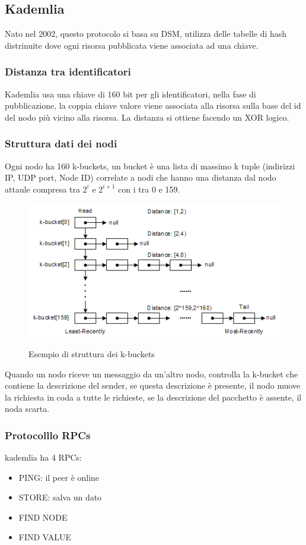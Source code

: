 \subsection{Kademlia}
Nato nel 2002, questo protocolo si basa su DSM, utilizza delle tabelle di hash distrinuite dove ogni risorsa pubblicata viene associata ad una chiave.

\subsubsection{Distanza tra identificatori}
Kademlia usa una chiave di 160 bit per gli identificatori, nella fase di pubblicazione, la coppia chiave valore viene associata alla risorsa sulla base del id del nodo più vicino alla risorsa.
La distanza si ottiene facendo un XOR logico.
\subsubsection{Struttura dati dei nodi}
Ogni nodo ha 160 k-buckets, un bucket è una lista di massimo k tuple (indirizzi IP, UDP port, Node ID) correlate a nodi che hanno una distanza dal nodo attaule compresa tra $2^i$ e $2^{i+1}$ con i tra 0 e 159.


\begin{figure}[h!]
    \centering
    \includegraphics[width=0.5\linewidth]{imgs/12 - kbuckets.png}
    \label{fig:k-buckets}
    \caption{Esempio di struttura dei k-buckets}
\end{figure}

Quando un nodo riceve un messaggio da un'altro nodo, controlla la k-bucket che contiene la descrizione del sender, se questa descrizione è presente, il nodo muove la richiesta in coda a tutte le richieste, se la descrizione del pacchetto è assente, il noda scarta.

\subsubsection{Protocolllo RPCs}
kademlia ha 4 RPCs:

\begin{itemize}
    \item PING: il peer è online
    \item STORE: salva un dato 
    \item FIND NODE
    \item FIND VALUE
\end{itemize}


